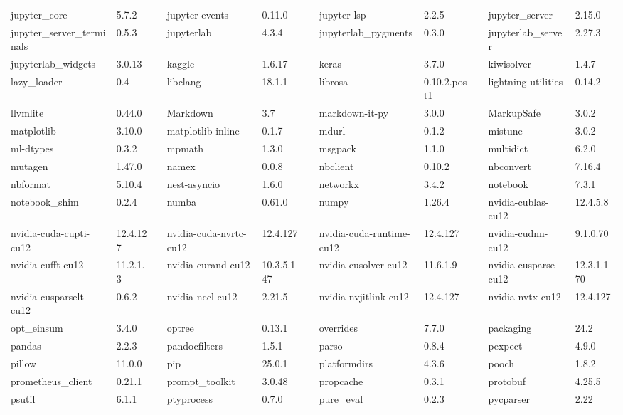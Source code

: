 \begin{table}[h]
{\begin{tabular}{llp{1.5cm}llp{1.5cm}llp{1.5cm}ll}
        jupyter\_core & 5.7.2 & & jupyter-events & 0.11.0 & & jupyter-lsp & 2.2.5 & & jupyter\_server & 2.15.0 \\
        jupyter\_server\_terminals & 0.5.3 & & jupyterlab & 4.3.4 & & jupyterlab\_pygments & 0.3.0 & & jupyterlab\_server & 2.27.3 \\
        jupyterlab\_widgets & 3.0.13 & & kaggle & 1.6.17 & & keras & 3.7.0 & & kiwisolver & 1.4.7 \\
        lazy\_loader & 0.4 & & libclang & 18.1.1 & & librosa & 0.10.2.post1 & & lightning-utilities & 0.14.2 \\
        llvmlite & 0.44.0 & & Markdown & 3.7 & & markdown-it-py & 3.0.0 & & MarkupSafe & 3.0.2 \\
        matplotlib & 3.10.0 & & matplotlib-inline & 0.1.7 & & mdurl & 0.1.2 & & mistune & 3.0.2 \\
        ml-dtypes & 0.3.2 & & mpmath & 1.3.0 & & msgpack & 1.1.0 & & multidict & 6.2.0 \\
        mutagen & 1.47.0 & & namex & 0.0.8 & & nbclient & 0.10.2 & & nbconvert & 7.16.4 \\
        nbformat & 5.10.4 & & nest-asyncio & 1.6.0 & & networkx & 3.4.2 & & notebook & 7.3.1 \\
        notebook\_shim & 0.2.4 & & numba & 0.61.0 & & numpy & 1.26.4 & & nvidia-cublas-cu12 & 12.4.5.8 \\
        nvidia-cuda-cupti-cu12 & 12.4.127 & & nvidia-cuda-nvrtc-cu12 & 12.4.127 & & nvidia-cuda-runtime-cu12 & 12.4.127 & & nvidia-cudnn-cu12 & 9.1.0.70 \\
        nvidia-cufft-cu12 & 11.2.1.3 & & nvidia-curand-cu12 & 10.3.5.147 & & nvidia-cusolver-cu12 & 11.6.1.9 & & nvidia-cusparse-cu12 & 12.3.1.170 \\
        nvidia-cusparselt-cu12 & 0.6.2 & & nvidia-nccl-cu12 & 2.21.5 & & nvidia-nvjitlink-cu12 & 12.4.127 & & nvidia-nvtx-cu12 & 12.4.127 \\
        opt\_einsum & 3.4.0 & & optree & 0.13.1 & & overrides & 7.7.0 & & packaging & 24.2 \\
        pandas & 2.2.3 & & pandocfilters & 1.5.1 & & parso & 0.8.4 & & pexpect & 4.9.0 \\
        pillow & 11.0.0 & & pip & 25.0.1 & & platformdirs & 4.3.6 & & pooch & 1.8.2 \\
        prometheus\_client & 0.21.1 & & prompt\_toolkit & 3.0.48 & & propcache & 0.3.1 & & protobuf & 4.25.5 \\
        psutil & 6.1.1 & & ptyprocess & 0.7.0 & & pure\_eval & 0.2.3 & & pycparser & 2.22 \\

\end{tabular}}
\end{table}
